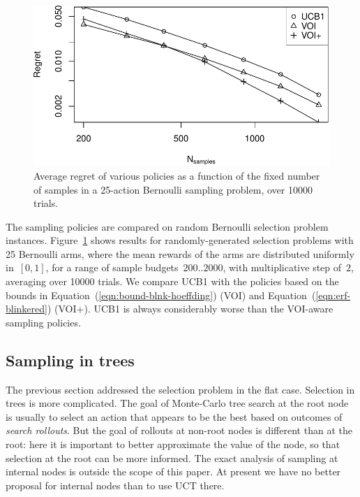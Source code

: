 \begin{figure}[h!]
\centering
\includegraphics[scale=0.55]{mcts-flat.pdf}
\caption{Average regret of various policies as a function of the fixed number 
of samples in a 25-action Bernoulli sampling problem, over 10000 trials.}
\label{fig:random-instances}
\end{figure}

The sampling policies are compared on random Bernoulli
selection problem instances. Figure~\ref{fig:random-instances} shows results for
randomly-generated selection problems with 25 Bernoulli arms, where
the mean rewards of the arms are distributed uniformly in~$[0,1]$, 
for a range of sample budgets~$200..2000$, with multiplicative
step of~$2$, averaging over 10000 trials.  We compare UCB1 with the 
policies based on the bounds in
Equation~(\ref{eqn:bound-blnk-hoeffding}) (VOI) and
Equation~(\ref{eqn:erf-blinkered}) (VOI+).
UCB1 is always considerably worse than the VOI-aware sampling policies.





\subsection{Sampling in trees}
\label{sec:empirical-evaluation}\label{mcts-section}

The previous section addressed the selection problem in the flat case.
Selection in trees is more complicated.  The goal of Monte-Carlo tree 
search \cite{Chaslot.montecarlo} at the root node 
is usually to select an action that appears to be the best based on outcomes
of \textit{search rollouts}.
But the goal of rollouts at non-root nodes
is different than at the root: here it is important to better approximate the
value of the node, so that selection at the root can be more informed. The exact analysis
of sampling at internal nodes is outside the scope of this paper. At present we 
have no better proposal for internal nodes than to use UCT there.

